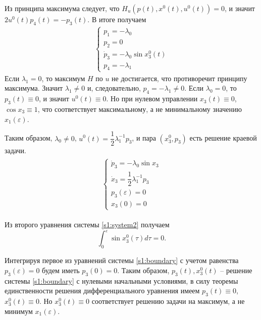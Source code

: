 \documentclass[../main.tex]{subfiles}
\begin{document}
Из принципа максимума следует, что
$H_u(p(t),x^0(t),u^0(t))=0$, и значит $2u^0(t)p_4(t)=-p_3(t)$.
В итоге получаем
\begin{equation*}
	\begin{array}{l}
		\left\{ {{{\begin{array}{l}
						{p_1 = -\lambda_0}\\
						{p_2 = 0}\\
						{{{\dot p}_3} = -\lambda_0 \sin x_3^0(t)}\\
						{p_4 =  -\lambda_1}
		\end{array}}}} \right.
	\end{array}
\end{equation*}
Если $ \lambda_1 = 0 $, то максимум $ H $ по $ u $ не достигается, что противоречит принципу максимума. Значит $ \lambda_1 \neq 0 $ и, следовательно, $p_4=-\lambda_1  \neq 0$. Если $ \lambda_0 = 0 $, то $ p_3(t) \equiv 0 $, и значит $ u^0(t) \equiv 0 $. Но при нулевом управлении $ x_3(t) \equiv 0 $, $ \cos x_3 \equiv 1 $, что соответствует максимальному, а не минимальному значению $ x_1(\varepsilon) $.


Таким образом, $ \lambda_0 \neq 0 $, $ u^0(t) = \dfrac{1}{2}\lambda_1^{-1}p_3 $, и пара $ (x_3^0,p_3) $ есть решение краевой задачи.
\begin{gather}\label{s1:boundary}
	\begin{array}{l}
		\left\{ {{{\begin{array}{l}
						{{{\dot p}_3} = -\lambda_0 \sin x_3}\\
						{{{\dot x}_3} =  \dfrac{1}{2}\lambda_1^{-1}p_3}\\
						{p_3(\varepsilon) = 0} \\
						{x_3(0) = 0}
		\end{array}}}} \right.
	\end{array}
\end{gather}

Из второго уравнения системы \eqref{s1:system2} получаем
\begin{equation*}
	\int_0^\varepsilon \sin x_3^0(\tau) d\tau = 0.
\end{equation*}

Интегрируя первое из уравнений системы \eqref{s1:boundary} с учетом равенства $ p_3(\varepsilon) = 0 $ будем иметь $ p_3(0) = 0 $. Таким образом, $ p_3(t), x_3^0(t) $  -- решение системы \eqref{s1:boundary} с нулевыми начальными условиями, в силу теоремы единственности решения дифференциального уравнения имеем $ p_3(t) \equiv 0$, $ x_3^0(t) \equiv 0 $. Но $ x_3^0(t) \equiv 0 $ соответствует решению задачи на максимум, а не минимум $ x_1(\varepsilon) $.
\end{document}

